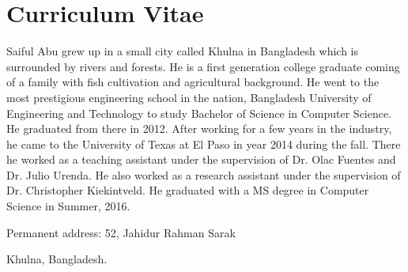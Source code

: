 
\chapter*{Curriculum Vitae}

Saiful Abu grew up in a small city called Khulna in Bangladesh which is surrounded by rivers and forests. He is a first generation college graduate coming of a family with fish cultivation and agricultural background. He went to the most prestigious engineering school in the nation, Bangladesh University of Engineering and Technology to study Bachelor of Science in Computer Science. He graduated from there in 2012. After working for a few years in the industry, he came to the University of Texas at El Paso in year 2014 during the fall. There he worked as a teaching assistant under the supervision of Dr. Olac Fuentes and Dr. Julio Urenda. He also worked as a research assistant under the supervision of Dr. Christopher Kiekintveld. He graduated with a MS degree in Computer Science in Summer, 2016. 



\medskip

\noindent
Permanent address: 52, Jahidur Rahman Sarak

\noindent
\hspace{1.42in}
Khulna, Bangladesh.

\vfill



